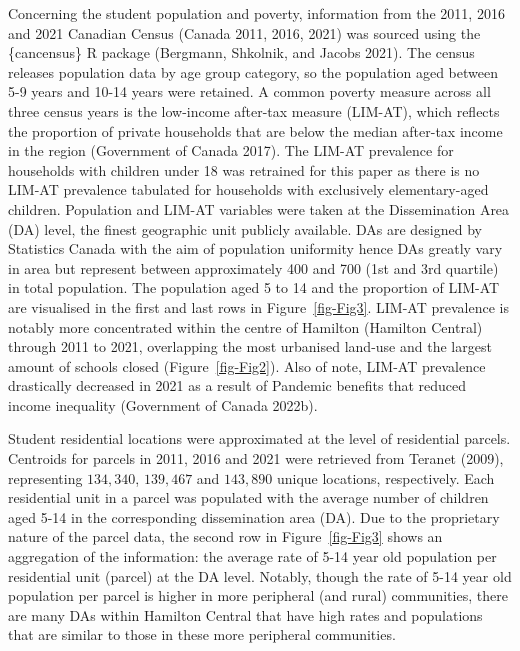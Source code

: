 \documentclass[
default
]{sn-jnl}
\begin{document}
Concerning the student population and poverty, information from the
2011, 2016 and 2021 Canadian Census (Canada 2011, 2016, 2021) was
sourced using the \{cancensus\} R package (Bergmann, Shkolnik, and
Jacobs 2021). The census releases population data by age group category,
so the population aged between 5-9 years and 10-14 years were retained.
A common poverty measure across all three census years is the low-income
after-tax measure (LIM-AT), which reflects the proportion of private
households that are below the median after-tax income in the region
(Government of Canada 2017). The LIM-AT prevalence for households with
children under 18 was retrained for this paper as there is no LIM-AT
prevalence tabulated for households with exclusively elementary-aged
children. Population and LIM-AT variables were taken at the
Dissemination Area (DA) level, the finest geographic unit publicly
available. DAs are designed by Statistics Canada with the aim of
population uniformity hence DAs greatly vary in area but represent
between approximately 400 and 700 (1st and 3rd quartile) in total
population. The population aged 5 to 14 and the proportion of LIM-AT are
visualised in the first and last rows in Figure~\ref{fig-Fig3}. LIM-AT
prevalence is notably more concentrated within the centre of Hamilton
(Hamilton Central) through 2011 to 2021, overlapping the most urbanised
land-use and the largest amount of schools closed
(Figure~\ref{fig-Fig2}). Also of note, LIM-AT prevalence drastically
decreased in 2021 as a result of Pandemic benefits that reduced income
inequality (Government of Canada 2022b).

Student residential locations were approximated at the level of
residential parcels. Centroids for parcels in 2011, 2016 and 2021 were
retrieved from Teranet (2009), representing \(134,340\), \(139,467\) and
\(143,890\) unique locations, respectively. Each residential unit in a
parcel was populated with the average number of children aged 5-14 in
the corresponding dissemination area (DA). Due to the proprietary nature
of the parcel data, the second row in Figure~\ref{fig-Fig3} shows an
aggregation of the information: the average rate of 5-14 year old
population per residential unit (parcel) at the DA level. Notably,
though the rate of 5-14 year old population per parcel is higher in more
peripheral (and rural) communities, there are many DAs within Hamilton
Central that have high rates and populations that are similar to those
in these more peripheral communities.
\end{document}
